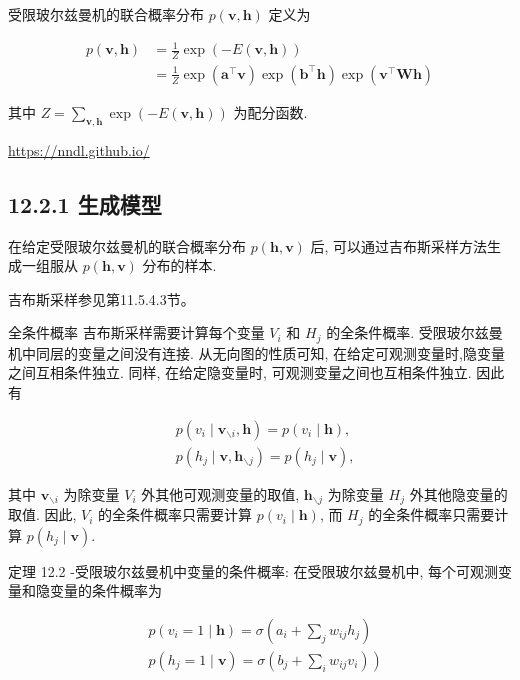 \documentclass[10pt]{article}
\begin{document}
受限玻尔兹曼机的联合概率分布 $p(\boldsymbol{v}, \boldsymbol{h})$ 定义为


\begin{align*}
p(\boldsymbol{v}, \boldsymbol{h}) & =\frac{1}{Z} \exp (-E(\boldsymbol{v}, \boldsymbol{h}))  \tag{12.29}\\
& =\frac{1}{Z} \exp \left(\boldsymbol{a}^{\top} \boldsymbol{v}\right) \exp \left(\boldsymbol{b}^{\top} \boldsymbol{h}\right) \exp \left(\boldsymbol{v}^{\top} \boldsymbol{W} \boldsymbol{h}\right) \tag{12.30}
\end{align*}


其中 $Z=\sum_{\boldsymbol{v}, \boldsymbol{h}} \exp (-E(\boldsymbol{v}, \boldsymbol{h}))$ 为配分函数.

\href{https://nndl.github.io/}{https://nndl.github.io/}

\subsection*{12.2.1 生成模型}
在给定受限玻尔兹曼机的联合概率分布 $p(\boldsymbol{h}, \boldsymbol{v})$ 后, 可以通过吉布斯采样方法生成一组服从 $p(\boldsymbol{h}, \boldsymbol{v})$ 分布的样本.

吉布斯采样参见第11.5.4.3节。

全条件概率 吉布斯采样需要计算每个变量 $V_{i}$ 和 $H_{j}$ 的全条件概率. 受限玻尔兹曼机中同层的变量之间没有连接. 从无向图的性质可知, 在给定可观测变量时,隐变量之间互相条件独立. 同样, 在给定隐变量时, 可观测变量之间也互相条件独立. 因此有


\begin{align*}
& p\left(v_{i} \mid \boldsymbol{v}_{\backslash i}, \boldsymbol{h}\right)=p\left(v_{i} \mid \boldsymbol{h}\right),  \tag{12.31}\\
& p\left(h_{j} \mid \boldsymbol{v}, \boldsymbol{h}_{\backslash j}\right)=p\left(h_{j} \mid \boldsymbol{v}\right), \tag{12.32}
\end{align*}


其中 $\boldsymbol{v}_{\backslash i}$ 为除变量 $V_{i}$ 外其他可观测变量的取值, $\boldsymbol{h}_{\backslash j}$ 为除变量 $H_{j}$ 外其他隐变量的取值. 因此, $V_{i}$ 的全条件概率只需要计算 $p\left(v_{i} \mid \boldsymbol{h}\right)$, 而 $H_{j}$ 的全条件概率只需要计算 $p\left(h_{j} \mid \boldsymbol{v}\right)$.

定理 12.2 -受限玻尔兹曼机中变量的条件概率: 在受限玻尔兹曼机中, 每个可观测变量和隐变量的条件概率为


\begin{align*}
& p\left(v_{i}=1 \mid \boldsymbol{h}\right)=\sigma\left(a_{i}+\sum_{j} w_{i j} h_{j}\right)  \tag{12.33}\\
& \left.p\left(h_{j}=1 \mid \boldsymbol{v}\right)=\sigma\left(b_{j}+\sum_{i} w_{i j} v_{i}\right)\right) \tag{12.34}
\end{align*}
\end{document}
